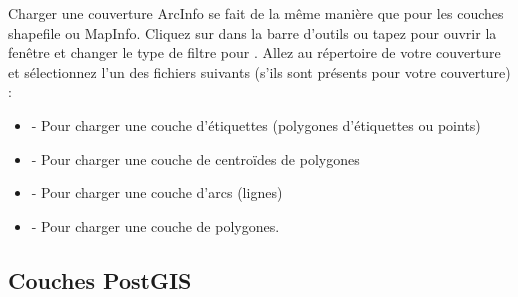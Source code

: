 Charger une couverture ArcInfo se fait de la m\^eme mani\`ere que pour les couches shapefile ou MapInfo. Cliquez sur  dans la barre d'outils ou tapez  pour ouvrir la fen\^etre  et changer le type de filtre pour . Allez au r\'epertoire de votre couverture et s\'electionnez l'un des fichiers suivants (s'ils sont pr\'esents pour votre couverture) :

\begin{itemize}
\item {} - Pour charger une couche d'\'etiquettes (polygones d'\'etiquettes ou points)
\item {} - Pour charger une couche de centro\"ides de polygones
\item {} - Pour charger une couche d'arcs (lignes)
\item {} - Pour charger une couche de polygones.
\end{itemize}

\subsection{Couches PostGIS}
\label{label_postgis}

